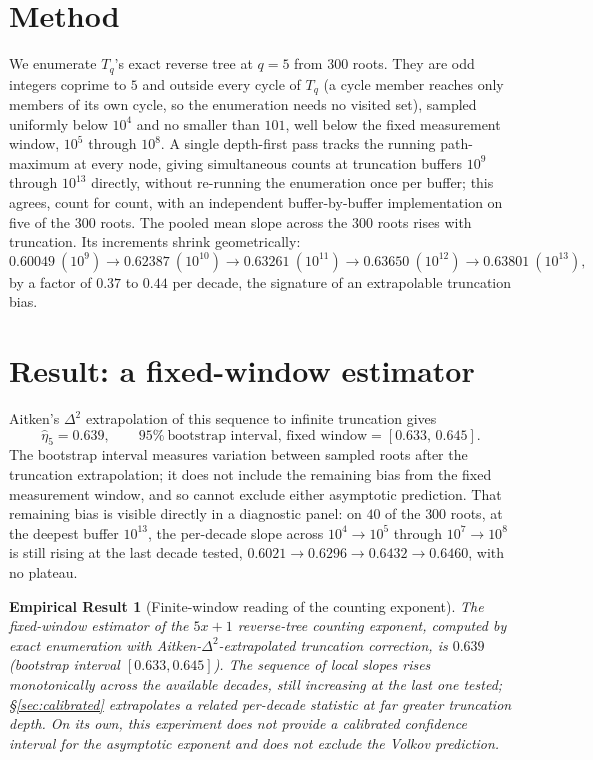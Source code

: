 \documentclass[11pt]{article}
\newtheorem{empirical}[theorem]{Empirical Result}
\theoremstyle{remark}
\begin{document}
\section{Method}
\label{sec:method}

We enumerate $T_q$'s exact reverse tree at $q=5$ from $300$ roots. They
are odd integers coprime to $5$ and outside every cycle of $T_q$ (a
cycle member reaches only members of its own cycle, so the enumeration
needs no visited set), sampled uniformly below $10^4$
and no smaller than $101$, well below the fixed measurement window,
$10^5$ through $10^8$. A single
depth-first pass tracks the running path-maximum at every node, giving
simultaneous counts at truncation buffers $10^9$ through $10^{13}$
directly, without re-running the enumeration once per buffer; this
agrees, count for count, with an independent buffer-by-buffer
implementation on five of the $300$ roots. The pooled mean slope across
the $300$ roots rises with truncation. Its increments shrink
geometrically:
\[
  0.60049\ (10^9) \to 0.62387\ (10^{10}) \to 0.63261\ (10^{11}) \to
  0.63650\ (10^{12}) \to 0.63801\ (10^{13}),
\]
by a factor of $0.37$ to $0.44$ per decade, the signature of an
extrapolable truncation bias.

\section{Result: a fixed-window estimator}
\label{sec:result}

Aitken's $\Delta^2$ extrapolation of this sequence to infinite
truncation gives
\begin{equation}\label{eq:kl-result}
  \hat\eta_5 = 0.639, \qquad 95\%\ \text{bootstrap interval, fixed window} =
  [0.633,\, 0.645].
\end{equation}
The bootstrap interval measures variation between sampled roots after
the truncation extrapolation; it does not include the remaining bias
from the fixed measurement window, and so cannot exclude either
asymptotic prediction. That remaining bias is visible directly in a
diagnostic panel: on $40$ of the $300$ roots, at the deepest buffer
$10^{13}$, the per-decade slope across $10^4\!\to\!10^5$ through
$10^7\!\to\!10^8$ is still rising at the last decade tested,
$0.6021\to0.6296\to0.6432\to0.6460$, with no plateau.

\begin{empirical}[Finite-window reading of the counting exponent]
\label{thm:kl}
The fixed-window estimator of the $5x+1$ reverse-tree counting
exponent, computed by exact enumeration with
Aitken-$\Delta^2$-extrapolated truncation correction, is $0.639$
(bootstrap interval $[0.633,0.645]$). The sequence of local slopes
rises monotonically across the available decades, still increasing at
the last one tested; \S\ref{sec:calibrated} extrapolates a related
per-decade statistic at far greater truncation depth. On its own, this
experiment does not provide a calibrated confidence interval for the
asymptotic exponent and does not exclude the Volkov prediction.
\end{empirical}
\end{document}
